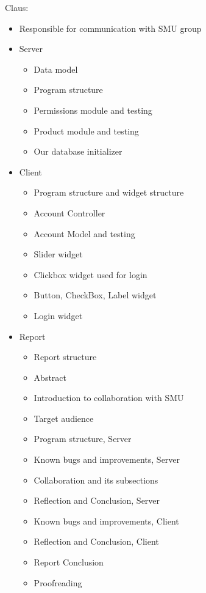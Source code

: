 Claus: 
\begin{itemize}
	\item Responsible for communication with SMU group
	\item Server
	\begin{itemize}
		\item Data model
		\item Program structure
		\item Permissions module and testing
		\item Product module and testing
		\item Our database initializer
	\end{itemize}
	\item Client
	\begin{itemize}
		\item Program structure and widget structure
		\item Account Controller
		\item Account Model and testing
		\item Slider widget
		\item Clickbox widget used for login
		\item Button, CheckBox, Label widget
		\item Login widget
	\end{itemize}
	\item Report
	\begin{itemize}
		\item Report structure
		\item Abstract
		\item Introduction to collaboration with SMU
		\item Target audience
		\item Program structure, Server
		\item Known bugs and improvements, Server
		\item Collaboration and its subsections
		\item Reflection and Conclusion, Server
		\item Known bugs and improvements, Client
		\item Reflection and Conclusion, Client
		\item Report Conclusion
		\item Proofreading
	\end{itemize}
\end{itemize}